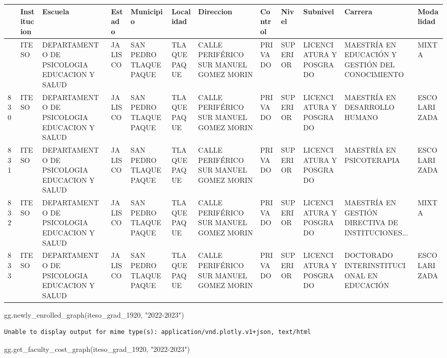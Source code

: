 \documentclass[
  letterpaper,
  DIV=11,
  numbers=noendperiod]{scrartcl}
\newenvironment{Shaded}{\begin{snugshade}}{\end{snugshade}}
\newcommand{\NormalTok}[1]{\textcolor[rgb]{0.00,0.23,0.31}{#1}}
\newcommand{\StringTok}[1]{\textcolor[rgb]{0.13,0.47,0.30}{#1}}
\begin{document}
\begin{longtable}[]{@{}llllllllllll@{}}
\toprule\noalign{}
& Institucion & Escuela & Estado & Municipio & Localidad & Direccion &
Control & Nivel & Subnivel & Carrera & Modalidad \\
\midrule\noalign{}
\endhead
\bottomrule\noalign{}
\endlastfoot
829 & ITESO & DEPARTAMENTO DE PSICOLOGIA EDUCACION Y SALUD & JALISCO &
SAN PEDRO TLAQUEPAQUE & TLAQUEPAQUE & CALLE PERIFÉRICO SUR MANUEL GOMEZ
MORIN & PRIVADO & SUPERIOR & LICENCIATURA Y POSGRADO & MAESTRÍA EN
EDUCACIÓN Y GESTIÓN DEL CONOCIMIENTO & MIXTA \\
830 & ITESO & DEPARTAMENTO DE PSICOLOGIA EDUCACION Y SALUD & JALISCO &
SAN PEDRO TLAQUEPAQUE & TLAQUEPAQUE & CALLE PERIFÉRICO SUR MANUEL GOMEZ
MORIN & PRIVADO & SUPERIOR & LICENCIATURA Y POSGRADO & MAESTRÍA EN
DESARROLLO HUMANO & ESCOLARIZADA \\
831 & ITESO & DEPARTAMENTO DE PSICOLOGIA EDUCACION Y SALUD & JALISCO &
SAN PEDRO TLAQUEPAQUE & TLAQUEPAQUE & CALLE PERIFÉRICO SUR MANUEL GOMEZ
MORIN & PRIVADO & SUPERIOR & LICENCIATURA Y POSGRADO & MAESTRÍA EN
PSICOTERAPIA & ESCOLARIZADA \\
832 & ITESO & DEPARTAMENTO DE PSICOLOGIA EDUCACION Y SALUD & JALISCO &
SAN PEDRO TLAQUEPAQUE & TLAQUEPAQUE & CALLE PERIFÉRICO SUR MANUEL GOMEZ
MORIN & PRIVADO & SUPERIOR & LICENCIATURA Y POSGRADO & MAESTRÍA EN
GESTIÓN DIRECTIVA DE INSTITUCIONES... & MIXTA \\
833 & ITESO & DEPARTAMENTO DE PSICOLOGIA EDUCACION Y SALUD & JALISCO &
SAN PEDRO TLAQUEPAQUE & TLAQUEPAQUE & CALLE PERIFÉRICO SUR MANUEL GOMEZ
MORIN & PRIVADO & SUPERIOR & LICENCIATURA Y POSGRADO & DOCTORADO
INTERINSTITUCIONAL EN EDUCACIÓN & ESCOLARIZADA \\
\end{longtable}

\begin{Shaded}
\begin{Highlighting}[]
\NormalTok{gg.newly\_enrolled\_graph(iteso\_grad\_1920, }\StringTok{"2022{-}2023"}\NormalTok{)}
\end{Highlighting}
\end{Shaded}

\begin{verbatim}
Unable to display output for mime type(s): application/vnd.plotly.v1+json, text/html
\end{verbatim}

\begin{Shaded}
\begin{Highlighting}[]
\NormalTok{gg.get\_faculty\_cost\_graph(iteso\_grad\_1920, }\StringTok{"2022{-}2023"}\NormalTok{)}
\end{Highlighting}
\end{Shaded}
\end{document}
